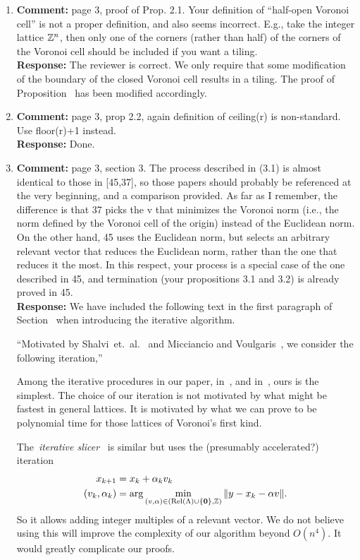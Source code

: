 \documentclass[a4paper,10pt]{article}
\begin{document}
\begin{enumerate}
\item\textbf{Comment:}  \label{com:rev2halfopen}
page 3, proof of Prop. 2.1. Your definition of ``half-open Voronoi cell'' is not a proper definition, and also seems incorrect. E.g., take the integer lattice ${\mathbb Z}^n$, then only one of the corners (rather than half) of the corners of the Voronoi cell should be included if you want a tiling. 
\\\textbf{Response:}
The reviewer is correct.  We only require that some modification of the boundary of the closed Voronoi cell results in a tiling.  The proof of Proposition~ has been modified accordingly.

\item\textbf{Comment:}  
page 3, prop 2.2, again definition of ceiling(r) is non-standard. Use floor(r)+1 instead. 
\\\textbf{Response:}
Done. 

\item\textbf{Comment:}  
page 3, section 3. 
The process described in (3.1) is almost identical to those in [45,37], so those papers should probably be referenced at the very beginning, and a comparison provided. As far as I remember, the difference is that 37 picks the v that minimizes the Voronoi norm (i.e., the norm defined by the Voronoi cell of the origin) instead of the Euclidean norm. On the other hand, 45 uses the Euclidean norm, but selects an arbitrary relevant vector that reduces the Euclidean norm, rather than the one that reduces it the most. In this respect, your process is a special case of the one described in 45, and termination (your propositions 3.1 and 3.2) is already proved in 45. 
\\\textbf{Response:}
We have included the following text in the first paragraph of Section~ when introducing the iterative algorithm.

``Motivated by Shalvi~et.~al.~\cite{Shalvi_iterativeslicer_2009} and  Micciancio and Voulgaris~\cite{MicciancioVoulgaris_deterministic_jv_2013}, we consider the following iteration,''

Among the iterative procedures in our paper, in~\cite{Shalvi_iterativeslicer_2009}, and in~\cite{MicciancioVoulgaris_deterministic_jv_2013}, ours is the simplest.  The choice of our iteration is not motivated by what might be fastest in general lattices.  It is motivated by what we can prove to be polynomial time for those lattices of Voronoi's first kind.

The~\emph{iterative slicer}~\cite{Shalvi_iterativeslicer_2009} is similar but uses the (presumably accelerated?) iteration
\begin{align*}
x_{k+1} &= x_k + \alpha_k v_k  \\
(v_k, \alpha_k) &= \arg\min_{ (v, \alpha) \in ( \operatorname{Rel}(\Lambda) \cup \{\boldsymbol{0}\}, {\mathbb Z}) } \|y - x_k - \alpha v \|.
\end{align*} 
So it allows adding integer multiples of a relevant vector.  We do not believe using this will improve the complexity of our algorithm beyond $O(n^4)$.  It would greatly complicate our proofs.


\end{enumerate}
\end{document}

